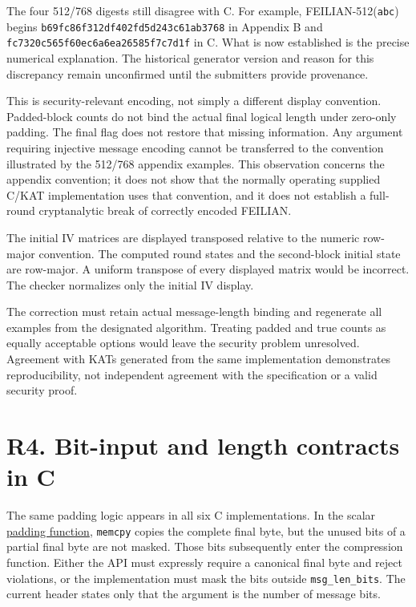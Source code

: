 \documentclass[
  english,
  11pt,
  a4paper,
]{article}
\begin{document}
The four 512/768 digests still disagree with C. For example,
FEILIAN-512(\texttt{abc}) begins
\nolinkurl{b69fc86f312df402fd5d243c61ab3768} in Appendix B and
\nolinkurl{fc7320c565f60ec6a6ea26585f7c7d1f} in C. What is now
established is the precise numerical explanation. The historical
generator version and reason for this discrepancy remain unconfirmed
until the submitters provide provenance.

This is security-relevant encoding, not simply a different display
convention. Padded-block counts do not bind the actual final logical
length under zero-only padding. The final flag does not restore that
missing information. Any argument requiring injective message encoding
cannot be transferred to the convention illustrated by the 512/768
appendix examples. This observation concerns the appendix convention; it
does not show that the normally operating supplied C/KAT implementation
uses that convention, and it does not establish a full-round
cryptanalytic break of correctly encoded FEILIAN.

The initial IV matrices are displayed transposed relative to the numeric
row-major convention. The computed round states and the second-block
initial state are row-major. A uniform transpose of every displayed
matrix would be incorrect. The checker normalizes only the initial IV
display.

The correction must retain actual message-length binding and regenerate
all examples from the designated algorithm. Treating padded and true
counts as equally acceptable options would leave the security problem
unresolved. Agreement with KATs generated from the same implementation
demonstrates reproducibility, not independent agreement with the
specification or a valid security proof.


\section{R4. Bit-input and length contracts in
C}\label{r4.-bit-input-and-length-contracts-in-c}

The same padding logic appears in all six C implementations. In the
scalar \href{data/SOURCES.md\#source-9}{padding function},
\texttt{memcpy} copies the complete final byte, but the unused bits of a
partial final byte are not masked. Those bits subsequently enter the
compression function. Either the API must expressly require a canonical
final byte and reject violations, or the implementation must mask the
bits outside \texttt{msg\_len\_bits}. The current header states only
that the argument is the number of message bits.
\end{document}
